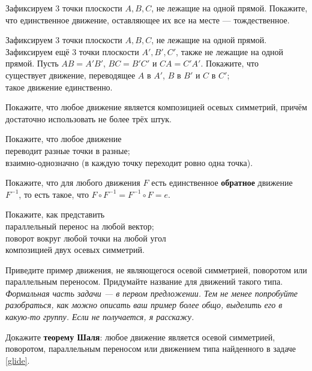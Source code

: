\documentclass[a4paper,12pt]{article}
\begin{document}
    \problem Зафиксируем 3 точки плоскости $A, B, C$, не лежащие на одной прямой. Покажите, что единственное движение, оставляющее их все на месте --- тождественное.
    
    \problem Зафиксируем 3 точки плоскости $A, B, C$, не лежащие на одной прямой. Зафиксируем ещё 3 точки плоскости $A', B', C'$, также не лежащие на одной прямой. Пусть $AB = A'B'$, $BC = B'C'$ и $CA = C'A'$. Покажите, что \\
    \sub существует движение, переводящее $A$ в $A'$, $B$ в $B'$ и $C$ в $C'$; \\
     такое движение единственно.
    
    \problem Покажите, что любое движение является композицией осевых симметрий, причём достаточно использовать не более трёх штук.
    
    \problem Покажите, что любое движение \\
     переводит разные точки в разные; \\
    \sub взаимно-однозначно (в каждую точку переходит ровно одна точка).
    
    \problem Покажите, что для любого движения $F$ есть единственное \textbf{обратное} движение $F^{-1}$, то есть такое, что $F \circ F^{-1} = F^{-1} \circ F = e$.
    
    \problem Покажите, как представить \\
    \sub параллельный перенос на любой вектор; \\
    \sub поворот вокруг любой точки на любой угол \\
    композицией двух осевых симметрий.
    
     \label{glide} Приведите пример движения, не являющегося осевой симметрией, поворотом или параллельным переносом. Придумайте название для движений такого типа. \textit{Формальная часть задачи --- в первом предложении. Тем не менее попробуйте разобраться, как можно описать ваш пример более общо, выделить его в какую-то группу. Если не получается, я расскажу.}
    
     Докажите \textbf{теорему Шаля}: любое движение является осевой симметрией, поворотом, параллельным переносом или движением типа найденного в задаче \ref{glide}.
    
\end{document}
